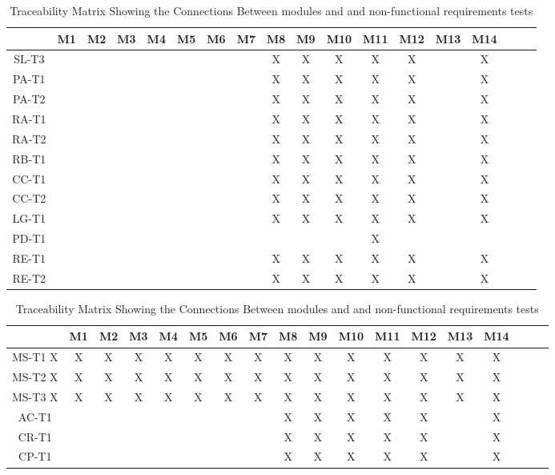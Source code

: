 \documentclass[12pt, titlepage]{article}
\begin{document}
\begin{landscape}
\begin{table}[h!]
\centering
\begin{tabular}{|c|c|c|c|c|c|c|c|c|c|c|c|c|c|c|c|c|c|}
\hline
	& M1 & M2 & M3 & M4 & M5 & M6 & M7 & M8 & M9 & M10 & M11 & M12 & M13& M14\\
\hline
SL-T3        & & & & & & & & X& X& X& X& X& &X \\ \hline
PA-T1        & & & & & & & & X& X& X& X& X& &X \\ \hline
PA-T2        & & & & & & & & X& X& X& X& X& &X \\ \hline
RA-T1        & & & & & & & & X& X& X& X& X& &X \\ \hline
RA-T2        & & & & & & & & X& X& X& X& X& &X \\ \hline
RB-T1        & & & & & & & & X& X& X& X& X& &X \\ \hline
CC-T1        & & & & & & & & X& X& X& X& X& &X \\ \hline
CC-T2        & & & & & & & & X& X& X& X& X& &X \\ \hline
LG-T1        & & & & & & & & X& X& X& X& X& &X \\ \hline
PD-T1        & & & & & & & & & & & X& & & \\ \hline
RE-T1        & & & & & & & & X& X& X& X& X& &X \\ \hline
RE-T2        & & & & & & & & X& X& X& X& X& &X \\ \hline
\end{tabular}
\caption{Traceability Matrix Showing the Connections Between modules and  and non-functional requirements tests}
\label{Table:A_trace}
\end{table}
\end{landscape}

\begin{landscape}
\begin{table}[h!]
\centering
\begin{tabular}{|c|c|c|c|c|c|c|c|c|c|c|c|c|c|c|c|c|c|}
\hline
	& M1 & M2 & M3 & M4 & M5 & M6 & M7 & M8 & M9 & M10 & M11 & M12 & M13& M14\\
\hline
MS-T1        X& X& X& X& X& X& X& X& X& X& X& X& X& X&X \\ \hline
MS-T2        X& X& X& X& X& X& X& X& X& X& X& X& X& X&X \\ \hline
MS-T3        X& X& X& X& X& X& X& X& X& X& X& X& X& X&X \\ \hline
AC-T1        & & & & & & & & X& X& X& X& X& &X \\ \hline
CR-T1        & & & & & & & & X& X& X& X& X& &X \\ \hline
CP-T1        & & & & & & & & X& X& X& X& X& &X \\ \hline
\end{tabular}
\caption{Traceability Matrix Showing the Connections Between modules and  and non-functional requirements tests}
\label{Table:A_trace}
\end{table}
\end{landscape}
\end{document}
